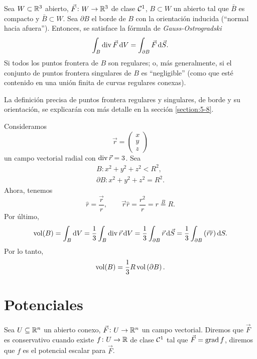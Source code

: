 \begin{teo}
    Sea $W \subset \mathbb{R}^3$ abierto, $\vec{F} \colon W \to \mathbb{R}^3$ de clase $\mathcal{C}^1$, $B \subset W$ un abierto tal que $\bar{B}$ es compacto y $\bar{B} \subset W$.
    Sea $\partial B$ el borde de $B$ con la orientación inducida (``normal hacia afuera''). Entonces, se satisface la fórmula de \emph{Gauss-Ostrogradski}
    \[
        \int_B \diver \vec{F} \dif V = \int_{\partial B} \vec{F} \dif \vec{S}.
    \]
    Si todos los puntos frontera de $B$ son regulares; o, más generalmente, si el conjunto de puntos frontera singulares de $B$ es ``negligible'' (como que est\'e 
    contenido en una unión finita de curvas regulares conexas).
\end{teo}

\begin{obs}
    La definición precisa de puntos frontera regulares y singulares, de borde y su orientación, se explicarán con más detalle en la sección \ref{section:5-8}.
\end{obs}

\begin{example*}
    Consideramos
    \[
        \vec{r} =
        \begin{pmatrix}
            x \\ y \\ z
        \end{pmatrix}
    \]
    un campo vectorial radial con $\operatorname{div} \vec{r} = 3$. Sea
    \begin{gather*}
        B : x^2  + y^2 + z^2 < R^2, \\
        \partial B : x^2 + y^2 + z^2 = R^2.
    \end{gather*}
    Ahora, tenemos
    \[
        \hat{r} = \frac{\vec{r}}{r}, \qquad
        \vec{r} \hat{r} = \frac{r^2}{r} = r \stackrel{B}{=} R.
    \]
    Por último,
    \[
        \vol(B) = \int_B \dif V = \frac{1}{3} \int_B \diver \vec{r} \dif V = \frac{1}{3} \int_{\partial B} \vec{r} \dif \vec{S}
        = \frac{1}{3} \int_{\partial B} \left( \vec{r} \hat{r} \right) \dif S.
    \]
    Por lo tanto,
    \[
        \operatorname{vol}(B) = \frac{1}{3} R \operatorname{vol}\left( \partial B \right).
    \]
\end{example*}

\section{Potenciales}

\begin{defi}
    Sea $U \subseteq \mathbb{R}^n$ un abierto conexo, $\vec{F} \colon U \to \mathbb{R}^n$ un campo vectorial. Diremos que $\vec{F}$ es conservativo
    cuando existe $f \colon U \to \mathbb{R}$ de clase $\mathcal{C}^1$ tal que $\vec{F} = \operatorname{grad} f$, diremos que $f$ es el potencial escalar para $\vec{F}$.
\end{defi}

